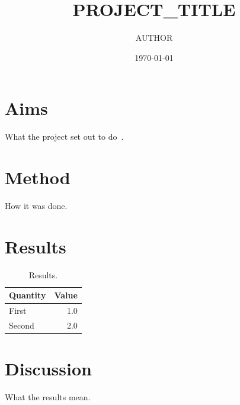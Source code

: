 \documentclass[11pt]{article}
\title{{{PROJECT_TITLE}}}
\author{{{AUTHOR}}}
\date{\today}
\begin{document}
\maketitle

\section{Aims}
What the project set out to do~\cite{einstein1905}.

\section{Method}
How it was done.

\section{Results}
\begin{table}[h]
  \centering
  \begin{tabular}{lr}
    \toprule
    Quantity & Value \\
    \midrule
    First & 1.0 \\
    Second & 2.0 \\
    \bottomrule
  \end{tabular}
  \caption{Results.}
\end{table}

\section{Discussion}
What the results mean.



\end{document}
